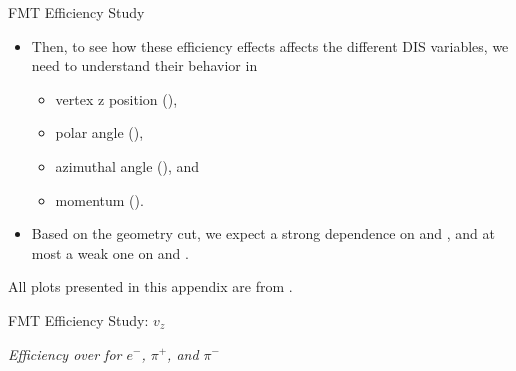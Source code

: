 \begin{frame}{FMT Efficiency Study}
    \label{20.04::fmt_efficiency_study}
    \begin{itemize}
        \item
            Then, to see how these efficiency effects affects the different DIS variables, we need to understand their behavior in

            \vspace{6pt}
            \begin{itemize}
                \item
                    vertex z position (),

                \item
                    polar angle (\ef{$\theta$}),

                \item
                    azimuthal angle (\ef{$\varphi$}), and

                \item
                    momentum ().
            \end{itemize}

        \vspace{12pt}
        \item
            Based on the geometry cut, we expect a strong dependence on  and \ef{$\theta$}, and at most a weak one on \ef{$\varphi$} and .
    \end{itemize}

    \vspace{12pt}
    \ef{*}All plots presented in this appendix are from .

\end{frame}

\begin{frame}{FMT Efficiency Study: $v_z$}
    \begin{center}
        \vspace{-6pt}
        \begin{figure}[t]
        \end{figure}
        \textit{Efficiency over  for $e^-$, $\pi^+$, and $\pi^-$}
    \end{center}

\end{frame}

